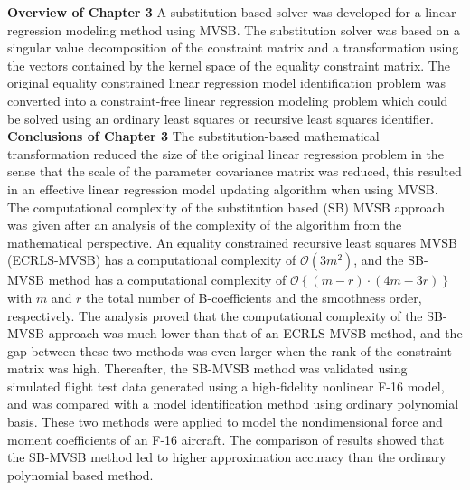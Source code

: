 \noindent \textbf{Overview of Chapter 3}  A substitution-based solver was developed for a linear regression modeling method using \ac{MVSB}. The substitution solver was based on a singular value decomposition of the constraint matrix and a transformation using the vectors contained by the kernel space of the equality constraint matrix. The original equality constrained linear regression model identification problem was converted into a constraint-free linear regression modeling problem which could be solved using an ordinary least squares or recursive least squares identifier.\\

\noindent \textbf{Conclusions of Chapter 3} The substitution-based mathematical transformation reduced the size of the original linear regression problem in the sense that the scale of the parameter covariance matrix was reduced, this resulted in an effective linear regression model updating algorithm when using \ac{MVSB}. The computational complexity of the substitution based (SB) \ac{MVSB} approach was given after an analysis of the complexity of the algorithm from the mathematical perspective. An equality constrained recursive least squares \ac{MVSB} (ECRLS-\ac{MVSB}) has a computational complexity of $\mathcal{O}\left(3m^2\right)$, and the SB-\ac{MVSB} method has a computational complexity of $\mathcal{O}\left\{\left(m-r\right)\cdot\left(4m-3r\right)\right\}$ with $m$ and $r$ the total number of B-coefficients and the smoothness order, respectively. The analysis proved that the computational complexity of the SB-MVSB approach was much lower than that of an ECRLS-\ac{MVSB} method, and the gap between these two methods was even larger when the rank of the constraint matrix was high. Thereafter, the SB-MVSB method was validated using simulated flight test data generated using a high-fidelity nonlinear F-16 model, and was compared with a model identification method using ordinary polynomial basis. These two methods were applied to model the nondimensional force and moment coefficients of an F-16 aircraft. The comparison of results showed that the SB-MVSB method led to higher approximation accuracy than the ordinary polynomial based method.

\vspace{-0.2cm}
\begin{shaded}
\end{shaded}
\vspace{-0.8cm}
\begin{shaded}
\end{shaded}

